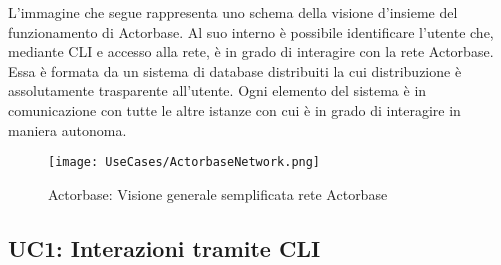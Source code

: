 \documentclass{scalatekids-article}
\begin{document}
L'immagine che segue rappresenta uno schema della visione d'insieme del
funzionamento di Actorbase. Al suo interno è possibile identificare l'utente
che, mediante CLI e accesso alla rete, è in grado di interagire con la rete
Actorbase. Essa è formata da un sistema di database distribuiti la cui
distribuzione è assolutamente trasparente all'utente. Ogni elemento del sistema
è in comunicazione con tutte le altre istanze con cui è in grado di interagire
in maniera autonoma.
\begin{figure}[H]
  \begin{center}
    \texttt{[image: UseCases/ActorbaseNetwork.png]}
    \caption{Actorbase: Visione generale semplificata rete Actorbase}
  \end{center}
\end{figure}

\subsection{UC1: Interazioni tramite CLI}
\end{document}
